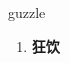 
\begin{frame}
{\huge guzzle}
\begin{center}
\begin{enumerate}\Large
  \item \textbf{狂饮}
\end{enumerate}
\end{center}
\end{frame}

